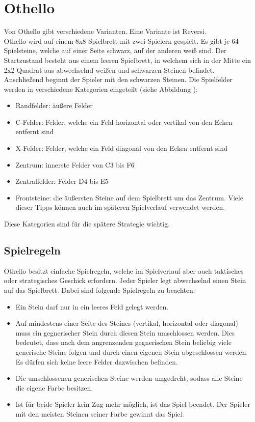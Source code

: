 \chapter{Othello}
\label{othello-chapter}
Von Othello gibt verschiedene Varianten. Eine Variante ist Reversi.
\\Othello wird auf einem 8x8 Spielbrett mit zwei Spielern gespielt. Es gibt je 64 Spielsteine, welche auf einer Seite schwarz, auf der anderen weiß sind. Der Startzustand besteht aus einem leeren Spielbrett, in welchem sich in der Mitte ein 2x2 Quadrat aus abwechselnd weißen und schwarzen Steinen befindet. Anschließend beginnt der Spieler mit den schwarzen Steinen.
Die Spielfelder werden in verschiedene Kategorien eingeteilt (siehe Abbildung
 ):
\begin{itemize}
\item Randfelder: äußere Felder
\item C-Felder: Felder, welche ein Feld horizontal oder vertikal von den Ecken entfernt sind
\item X-Felder: Felder, welche ein Feld diagonal von den Ecken entfernt sind
\item Zentrum: innerste Felder von C3 bis F6
\item Zentralfelder: Felder D4 bis E5
\item Frontsteine: die äußersten Steine auf dem Spielbrett um das Zentrum.
Viele dieser Tipps können auch im späteren Spielverlauf verwendet werden.
\end{itemize}
Diese Kategorien sind für die spätere Strategie wichtig.
\section{Spielregeln}
Othello besitzt einfache Spielregeln, welche im Spielverlauf aber auch taktisches oder strategisches Geschick erfordern. Jeder Spieler legt abwechselnd einen Stein auf das Spielbrett. Dabei sind folgende Spielregeln zu beachten:
\begin{itemize}
\item Ein Stein darf nur in ein leeres Feld gelegt werden.
\item Auf mindestens einer Seite des Steines (vertikal, horizontal oder diagonal) muss ein gegnerischer Stein durch diesen Stein umschlossen werden. Dies bedeutet, dass nach dem angrenzenden gegnerischen Stein beliebig viele generische Steine folgen und durch einen eigenen Stein abgeschlossen werden. Es dürfen sich keine leere Felder dazwischen befinden.
\item Die umschlossenen generischen Steine werden umgedreht, sodass alle Steine die eigene Farbe besitzen.
\item Ist für beide Spieler kein Zug mehr möglich, ist das Spiel beendet. Der Spieler mit den meisten Steinen seiner Farbe gewinnt das Spiel.
\end{itemize}
